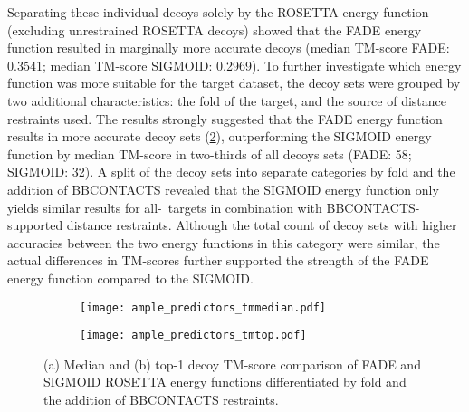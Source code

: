 Separating these individual decoys solely by the ROSETTA energy function (excluding unrestrained ROSETTA decoys) showed that the FADE energy function resulted in marginally more accurate decoys (median TM-score FADE: 0.3541; median TM-score SIGMOID: 0.2969). To further investigate which energy function was more suitable for the target dataset, the decoy sets were grouped by two additional characteristics: the fold of the target, and the source of distance restraints used. The results strongly suggested that the FADE energy function results in more accurate decoy sets (\cref{fig:ample_predictor_tmmedian}), outperforming the SIGMOID energy function by median TM-score in two-thirds of all decoys sets (FADE: 58; SIGMOID: 32). A split of the decoy sets into separate categories by fold and the addition of BBCONTACTS revealed that the SIGMOID energy function only yields similar results for all-\textbeta\ targets in combination with BBCONTACTS-supported distance restraints. Although the total count of decoy sets with higher accuracies between the two energy functions in this category were similar, the actual differences in TM-scores further supported the strength of the FADE energy function compared to the SIGMOID.

\begin{figure}[H]
    \centering
    \begin{subfigure}[b]{\textwidth}
        \centering
        \texttt{[image: ample\_predictors\_tmmedian.pdf]}
        \caption{}
        \label{fig:ample_predictor_tmmedian}
    \end{subfigure}
\end{figure}

\begin{figure}[H]\ContinuedFloat
    \begin{subfigure}[b]{\textwidth}
        \centering
        \texttt{[image: ample\_predictors\_tmtop.pdf]}
        \caption{}
        \label{fig:ample_predictor_tmtop}
    \end{subfigure}
    \caption[TM-score comparison between ROSETTA energy functions]{(a) Median and (b) top-1 decoy TM-score comparison of FADE and SIGMOID ROSETTA energy functions differentiated by fold and the addition of BBCONTACTS restraints.}
\end{figure}

